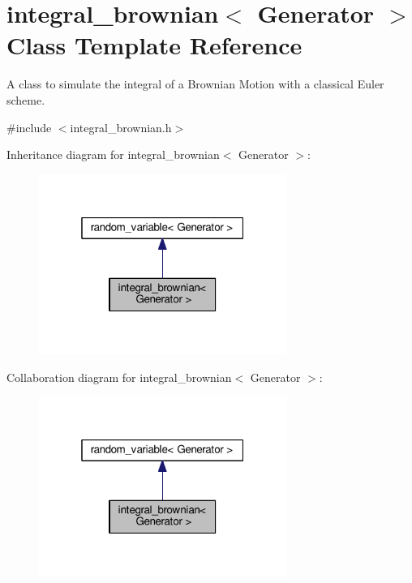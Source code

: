\hypertarget{classintegral__brownian}{}\section{integral\+\_\+brownian$<$ Generator $>$ Class Template Reference}
\label{classintegral__brownian}


A class to simulate the integral of a Brownian Motion with a classical Euler scheme.  




{\ttfamily \#include $<$integral\+\_\+brownian.\+h$>$}



Inheritance diagram for integral\+\_\+brownian$<$ Generator $>$\+:\nopagebreak
\begin{figure}[H]
\begin{center}
\leavevmode
\includegraphics[width=229pt]{classintegral__brownian__inherit__graph}
\end{center}
\end{figure}


Collaboration diagram for integral\+\_\+brownian$<$ Generator $>$\+:\nopagebreak
\begin{figure}[H]
\begin{center}
\leavevmode
\includegraphics[width=229pt]{classintegral__brownian__coll__graph}
\end{center}
\end{figure}
